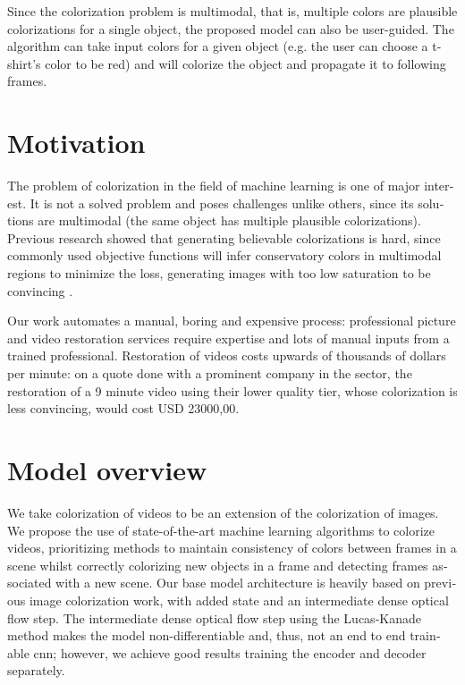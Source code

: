 \documentclass[12pt,openright,oneside,a4paper,english]{abntex2}
\begin{document}
\begin{otherlanguage}{english}
    Since the colorization problem is multimodal, that is, multiple colors are plausible colorizations for a single object, the proposed model can also be user-guided. The algorithm can take input colors for a given object (e.g. the user can choose a t-shirt's color to be red) and will colorize the object and propagate it to following frames.

    \section{Motivation} \label{sec:Motivation}
    The problem of colorization in the field of machine learning is one of major interest. It is not a solved problem and poses challenges unlike others, since its solutions are multimodal (the same object has multiple plausible colorizations). Previous research showed that generating believable colorizations is hard, since commonly used objective functions will infer conservatory colors in multimodal regions to minimize the loss, generating images with too low saturation to be convincing \cite{colorful}.

    Our work automates a manual, boring and expensive process: professional picture and video restoration services require expertise and lots of manual inputs from a trained professional. Restoration of videos costs upwards of thousands of dollars per minute: on a quote done with a prominent company in the sector, the restoration of a 9 minute video using their lower quality tier, whose colorization is less convincing, would cost USD 23000,00.

    \section{Model overview}

    We take colorization of videos to be an extension of the colorization of images. We propose the use of state-of-the-art machine learning algorithms to colorize videos, prioritizing methods to maintain consistency of colors between frames in a scene whilst correctly colorizing new objects in a frame and detecting frames associated with a new scene. Our base model architecture is heavily based on previous image colorization work, with added state and an intermediate dense optical flow step. The intermediate dense optical flow step using the Lucas-Kanade method makes the model non-differentiable and, thus, not an end to end trainable \acrshort{cnn}; however, we achieve good results training the encoder and decoder separately.


\end{otherlanguage}
\end{document}
